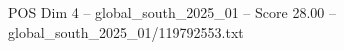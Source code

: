 \begin{textsample}{POS Dim 4 – global\_south\_2025\_01 – Score 28.00 – global\_south\_2025\_01/119792553.txt}
\end{textsample}
